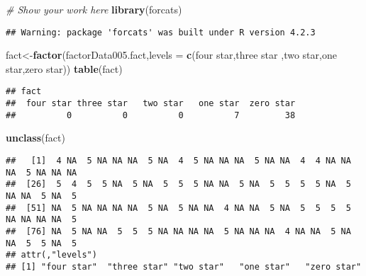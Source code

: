 \documentclass[
]{article}
\newenvironment{Shaded}{\begin{snugshade}}{\end{snugshade}}
\newcommand{\AttributeTok}[1]{\textcolor[rgb]{0.13,0.29,0.53}{#1}}
\newcommand{\CommentTok}[1]{\textcolor[rgb]{0.56,0.35,0.01}{\textit{#1}}}
\newcommand{\FunctionTok}[1]{\textcolor[rgb]{0.13,0.29,0.53}{\textbf{#1}}}
\newcommand{\NormalTok}[1]{#1}
\newcommand{\OtherTok}[1]{\textcolor[rgb]{0.56,0.35,0.01}{#1}}
\newcommand{\StringTok}[1]{\textcolor[rgb]{0.31,0.60,0.02}{#1}}
\begin{document}
\begin{Shaded}
\begin{Highlighting}[]
\CommentTok{\# Show your work here}
\FunctionTok{library}\NormalTok{(forcats)}
\end{Highlighting}
\end{Shaded}

\begin{verbatim}
## Warning: package 'forcats' was built under R version 4.2.3
\end{verbatim}

\begin{Shaded}
\begin{Highlighting}[]
\NormalTok{fact}\OtherTok{\textless{}{-}}\FunctionTok{factor}\NormalTok{(factorData005.fact,}\AttributeTok{levels =} \FunctionTok{c}\NormalTok{(}\StringTok{\textquotesingle{}four star\textquotesingle{}}\NormalTok{,}\StringTok{\textquotesingle{}three star\textquotesingle{}}
\NormalTok{                                           ,}\StringTok{\textquotesingle{}two star\textquotesingle{}}\NormalTok{,}\StringTok{\textquotesingle{}one star\textquotesingle{}}\NormalTok{,}\StringTok{\textquotesingle{}zero star\textquotesingle{}}\NormalTok{))}
\FunctionTok{table}\NormalTok{(fact)}
\end{Highlighting}
\end{Shaded}

\begin{verbatim}
## fact
##  four star three star   two star   one star  zero star 
##          0          0          0          7         38
\end{verbatim}

\begin{Shaded}
\begin{Highlighting}[]
\FunctionTok{unclass}\NormalTok{(fact)}
\end{Highlighting}
\end{Shaded}

\begin{verbatim}
##   [1]  4 NA  5 NA NA NA  5 NA  4  5 NA NA NA  5 NA NA  4  4 NA NA NA  5 NA NA NA
##  [26]  5  4  5  5 NA  5 NA  5  5  5 NA NA  5 NA  5  5  5  5 NA  5 NA NA  5 NA  5
##  [51] NA  5 NA NA NA NA  5 NA  5 NA NA  4 NA NA  5 NA  5  5  5  5 NA NA NA NA  5
##  [76] NA  5 NA NA  5  5  5 NA NA NA NA  5 NA NA NA  4 NA NA  5 NA NA  5  5 NA  5
## attr(,"levels")
## [1] "four star"  "three star" "two star"   "one star"   "zero star"
\end{verbatim}

\newpage
\end{document}
